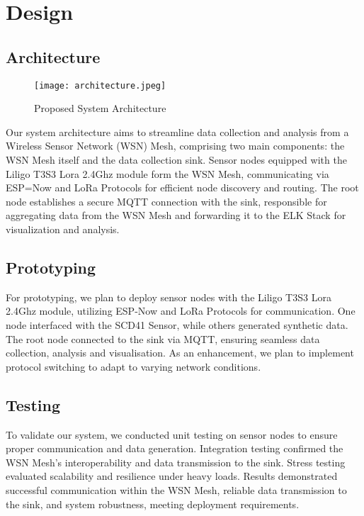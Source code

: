 \section*{Design}\label{design}


\subsection{Architecture}\label{architecture}

\begin{figure}[h]
  \begin{center}
    \texttt{[image: architecture.jpeg]}
  \end{center}
  \caption{Proposed System Architecture}\label{architecture}
\end{figure}

Our system architecture aims to streamline data collection and analysis from a Wireless Sensor Network (WSN) Mesh, comprising two main components: the WSN Mesh itself and the data collection sink. Sensor nodes equipped with the Liligo T3S3 Lora 2.4Ghz module form the WSN Mesh, communicating via ESP=Now and LoRa Protocols for efficient node discovery and routing. The root node establishes a secure MQTT connection with the sink, responsible for aggregating data from the WSN Mesh and forwarding it to the ELK Stack for visualization and analysis.

\subsection{Prototyping}\label{prototyping}
For prototyping, we plan to deploy sensor nodes with the Liligo T3S3 Lora 2.4Ghz module, utilizing ESP-Now and LoRa Protocols for communication. One node interfaced with the SCD41 Sensor, while others generated synthetic data. The root node connected to the sink via MQTT, ensuring seamless data collection, analysis and visualisation. As an enhancement, we plan to implement protocol switching to adapt to varying network conditions.

\subsection{Testing}\label{testing}
To validate our system, we conducted unit testing on sensor nodes to ensure proper communication and data generation. Integration testing confirmed the WSN Mesh's interoperability and data transmission to the sink. Stress testing evaluated scalability and resilience under heavy loads. Results demonstrated successful communication within the WSN Mesh, reliable data transmission to the sink, and system robustness, meeting deployment requirements.

